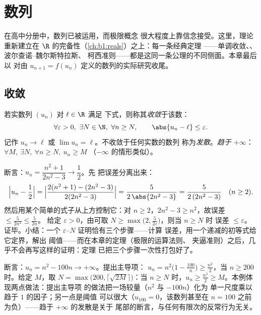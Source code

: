 \chapter{数列}\label{ch:b1:seq}

在高中分册中，数列已被运用，而极限概念
很大程度上靠信念接受。这里，理论重新建立在
$\R$ 的完备性（\cref{ch:b1:reals}）之上：每一条经典定理
——单调收敛、、波尔查诺--魏尔斯特拉斯、
柯西准则——都是这同一条公理的不同侧面。本章最后以
对由 $u_{n+1} =
f(u_n)$ 定义的数列的实际研究收尾。

\section{收敛}

\begin{definition}[数列的极限]\label{def:b1:seq:limit}
若实数列 $(u_n)$ 对 $\ell \in \R$ 满足
下式，则称其\emph{收敛}于该数：
\[
\forall \varepsilon > 0,\ \exists N \in \N,\ \forall n \geq N,
\qquad \abs{u_n - \ell} \leq \varepsilon .
\]
记作 $u_n \to \ell$ 或 $\lim u_n = \ell$。不收敛于任何实数的数列
称为\emph{发散}。\emph{趋于
$+\infty$}：$\forall M,\ \exists N,\ \forall n \geq N,\ u_n \geq M$
（$-\infty$ 的情形类似）。
\end{definition}

\begin{example}\label{ex:b1:seq:epsilonN}
断言：$u_n = \dfrac{n^2 + 1}{2n^2 - 3} \to \dfrac12$。先
把误差分离出来：
\[
\Bigl| u_n - \frac12 \Bigr|
= \Bigl| \frac{2(n^2 + 1) - (2n^2 - 3)}{2(2n^2 - 3)} \Bigr|
= \frac{5}{2\,\abs{2n^2 - 3}}
= \frac{5}{2\,(2n^2 - 3)} \quad (n \geq 2).
\]
然后用某个简单的式子从上方控制它：对 $n \geq 2$，$2n^2 - 3
\geq n^2$，故误差 $\leq \frac{5}{2n^2} \leq \frac 5{2n}$。
给定 $\varepsilon > 0$，由可取 $N \geq
\max\bigl(2, \frac{5}{2\varepsilon}\bigr)$，则当 $n \geq N$ 时
误差 $\leq \varepsilon$。证毕。小结：一个
$\varepsilon$--$N$ 证明恰有三个步骤——计算
误差，用一个递减的初等式给它定界，解出
阈值——而在本章的定理（极限的运算法则、
夹逼准则）之后，几乎不会再写这样的证明：定理
已把三个步骤一次性打包好了。
\end{example}

\begin{example}\label{ex:b1:seq:toinfinity}
断言：$u_n = n^2 - 100n \to +\infty$。提出主导项：
$u_n = n^2\bigl(1 - \frac{100}{n}\bigr) \geq \frac{n^2}{2}$，当
$n \geq 200$ 时。给定 $M$，取 $N = \max\bigl(200,
\lceil\sqrt{2M}\rceil\bigr)$：当 $n \geq N$ 时，$u_n \geq
\frac{n^2}{2} \geq M$。本例体现两点做法：提出主导项
的做法把一场较量（$n^2$ 与 $-100n$）化为
单一尺度乘以趋于 $1$ 的因子；另一点是阈值
可以很大（$u_{100} = 0$，该数列甚至在
$n = 100$ 之前为负）——趋于 $+\infty$ 的发散是关于
尾部的断言，与任何有限次的反常行为无关。
\end{example}


